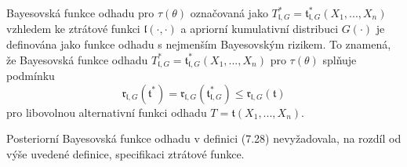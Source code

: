 \begin{definition}
Bayesovská funkce odhadu pro $\tau(\theta)$ označovaná jako $T_{\mathfrak{l}, G}^* = \mathfrak{t}_{\mathfrak{l}, G}^*(X_1, ..., X_n)$ vzhledem ke ztrátové funkci $\mathfrak{l}(\cdot, \cdot)$ a apriorní kumulativní distribuci $G(\cdot)$ je definována jako funkce odhadu s nejmenším Bayesovským rizikem. To znamená, že Bayesovská funkce odhadu  $T_{\mathfrak{l}, G}^* = \mathfrak{t}_{\mathfrak{l}, G}^*(X_1, ..., X_n)$ pro $\tau(\theta)$ splňuje podmínku
\begin{equation*}
\mathfrak{r}_{\mathfrak{l}, G}(\mathfrak{t}^*) = \mathfrak{r}_{\mathfrak{l}, G}(\mathfrak{t}^*_{\mathfrak{l}, G}) \le \mathfrak{r}_{\mathfrak{l},G}(\mathfrak{t})
\end{equation*}
pro libovolnou alternativní funkci odhadu $T = \mathfrak{t}(X_1, ..., X_n)$.
\end{definition}

Posteriorní Bayesovská funkce odhadu v definici (7.28) nevyžadovala, na rozdíl od výše uvedené definice, specifikaci ztrátové funkce.

